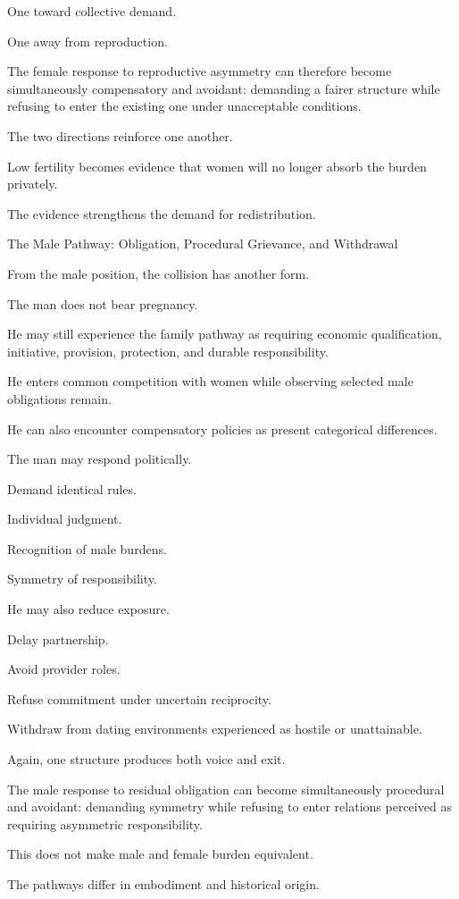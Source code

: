 One toward collective demand.

One away from reproduction.

The female response to reproductive asymmetry can therefore become simultaneously compensatory and avoidant: demanding a fairer structure while refusing to enter the existing one under unacceptable conditions.

The two directions reinforce one another.

Low fertility becomes evidence that women will no longer absorb the burden privately.

The evidence strengthens the demand for redistribution.

The Male Pathway: Obligation, Procedural Grievance, and Withdrawal

From the male position, the collision has another form.

The man does not bear pregnancy.

He may still experience the family pathway as requiring economic qualification, initiative, provision, protection, and durable responsibility.

He enters common competition with women while observing selected male obligations remain.

He can also encounter compensatory policies as present categorical differences.

The man may respond politically.

Demand identical rules.

Individual judgment.

Recognition of male burdens.

Symmetry of responsibility.

He may also reduce exposure.

Delay partnership.

Avoid provider roles.

Refuse commitment under uncertain reciprocity.

Withdraw from dating environments experienced as hostile or unattainable.

Again, one structure produces both voice and exit.

The male response to residual obligation can become simultaneously procedural and avoidant: demanding symmetry while refusing to enter relations perceived as requiring asymmetric responsibility.

This does not make male and female burden equivalent.

The pathways differ in embodiment and historical origin.

